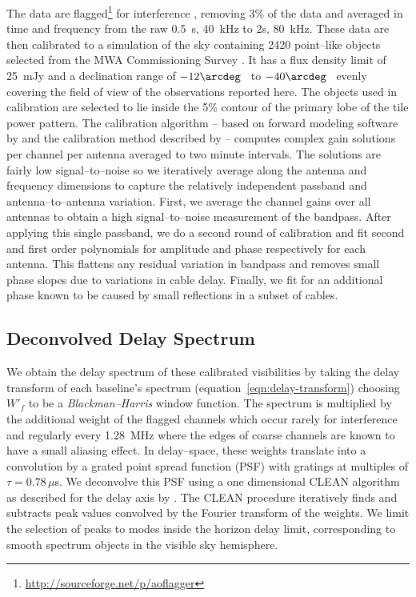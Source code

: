 \documentclass[preprint2,iop,numberedappendix]{emulateapj}
\begin{document}
The data are flagged\footnote{\url{http://sourceforge.net/p/aoflagger}} for interference \citep{off10,off12}, removing 3\% of the data and averaged in time  and frequency from the raw 0.5~s, 40~kHz to 2s, 80~kHz. These data are then calibrated to a simulation of the sky containing 2420 point--like objects selected from the MWA Commissioning Survey \citep[MWACS;][]{hur14}. It has a flux density limit of 25~mJy and a declination range of $-12\arcdeg$~ to $-40\arcdeg$~ evenly covering the field of view of the observations reported here. The objects used in calibration are selected to lie inside the 5\% contour of the primary lobe of the tile power pattern. The calibration algorithm -- based on forward modeling software by \citet{sul12} and the calibration method described by \citet{sal14} -- computes complex gain solutions per channel per antenna averaged to two minute intervals. The solutions are fairly low signal--to--noise so we iteratively average along the antenna and frequency dimensions to capture the relatively independent passband and antenna--to--antenna variation. First, we average the channel gains over all antennas to obtain a high signal--to--noise measurement of the bandpass. After applying this single passband, we do a second round of calibration and fit second and first order polynomials for amplitude and phase respectively for each antenna. This flattens any residual variation in bandpass and removes small phase slopes due to variations in cable delay. Finally, we fit for an additional phase known to be caused by small reflections in a subset of cables. 

\subsection{Deconvolved Delay Spectrum}\label{sec:data-delay-spectrum}

We obtain the delay spectrum of these calibrated visibilities by taking the delay transform of each baseline's spectrum (equation~\ref{eqn:delay-transform}) choosing $W'_f$ to be a {\it Blackman--Harris} window function. The spectrum is multiplied by the additional weight of the flagged channels which occur rarely for interference and regularly every 1.28~MHz where the edges of coarse channels are known to have a small aliasing effect. In delay--space, these weights translate into a convolution by a grated point spread function (PSF) with gratings at multiples of $\tau=0.78\,\mu$s. We deconvolve this PSF using a one dimensional CLEAN algorithm \citep{tay99} as described for the delay axis by \citet{par09,par12b}. The CLEAN procedure iteratively finds and subtracts peak values convolved by the Fourier transform of the weights. We limit the selection of peaks to modes inside the horizon delay limit, corresponding to smooth spectrum objects in the visible sky hemisphere. 
\end{document}
